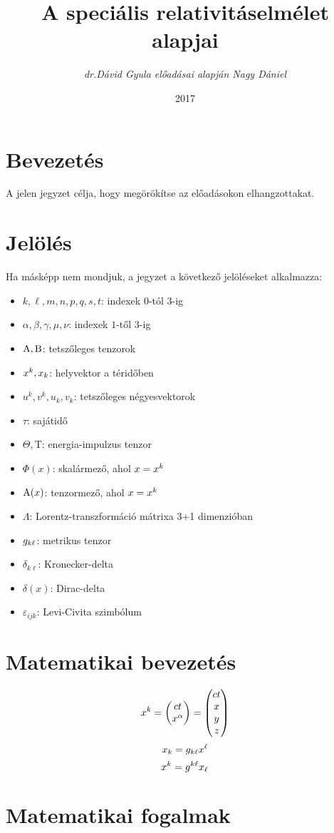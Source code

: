 \documentclass[a4paper,12pt]{article}
\title{\textbf{A speciális relativitáselmélet alapjai\\
\vspace{24pt}}}
\author{\textsl{dr.Dávid Gyula előadásai alapján Nagy Dániel}}
\date{2017}
\begin{document}
\maketitle
\pagebreak
\tableofcontents

\section{Bevezetés}
A jelen jegyzet célja, hogy megörökítse az előadásokon elhangzottakat.
\section{Jelölés}
Ha másképp nem mondjuk, a jegyzet a következő jelöléseket alkalmazza: \\
\begin{itemize}
\item $k, \ell, m, n, p, q, s, t$: indexek $0$-tól $3$-ig
\item $\alpha, \beta, \gamma, \mu, \nu$: indexek $1$-től $3$-ig
\item $\mathrm{A},\mathrm{B}$: tetszőleges tenzorok
\item $x^k, x_k$: helyvektor a téridőben
\item $u^k, v^k, u_k, v_k$: tetszőleges négyesvektorok
\item $\tau$: sajátidő
\item $\Theta, \mathrm{T}$: energia-impulzus tenzor
\item $\Phi(x)$: skalármező, ahol $x=x^k$
\item $\mathrm{A}(x)$: tenzormező, ahol $x=x^k$
\item $\Lambda$: Lorentz-transzformáció mátrixa 3+1 dimenzióban
\item $g_{k\ell}$: metrikus tenzor
\item $\delta_{k\ell}$: Kronecker-delta
\item $\delta(x)$: Dirac-delta
\item $\varepsilon_{ijk}$: Levi-Civita szimbólum
\end{itemize}

\pagebreak
\section{Matematikai bevezetés}
$$x^k = \begin{pmatrix} ct \\ x^\alpha \end{pmatrix} = \begin{pmatrix} ct \\ x \\ y \\ z \end{pmatrix}$$
$$x_k = g_{k\ell} x^{\ell}$$
$$x^k = g^{k\ell}x_{\ell}$$
\appendix
\section{Matematikai fogalmak}
\end{document}
